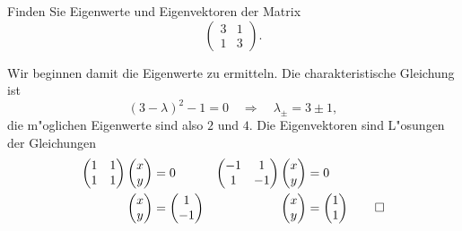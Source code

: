 Finden Sie Eigenwerte und Eigenvektoren der Matrix
\[
\begin{pmatrix}
3&1\\
1&3
\end{pmatrix}.
\]

\begin{loesung}
Wir beginnen damit die Eigenwerte zu ermitteln.
Die charakteristische Gleichung ist
\[
(3-\lambda)^2-1=0\quad\Rightarrow\quad\lambda_{\pm}=3\pm 1,
\]
die m"oglichen Eigenwerte sind also $2$ und $4$. Die Eigenvektoren sind
L"osungen der Gleichungen
\begin{align*}
\begin{pmatrix}1&1\\1&1\end{pmatrix}\begin{pmatrix}x\\y\end{pmatrix}&=0
&
\begin{pmatrix}-1&1\\1&-1\end{pmatrix}\begin{pmatrix}x\\y\end{pmatrix}&=0
\\
\begin{pmatrix}x\\y\end{pmatrix}&=\begin{pmatrix}1\\-1\end{pmatrix}
&
\begin{pmatrix}x\\y\end{pmatrix}&=\begin{pmatrix}1\\1\end{pmatrix}
\qedhere
\end{align*}
\end{loesung}

